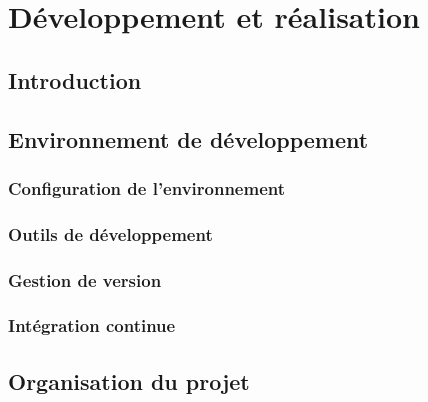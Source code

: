 
\chapter{Développement et réalisation}
\label{chap:realisation}

\section{Introduction}


\section{Environnement de développement}


\subsection{Configuration de l'environnement}


\subsection{Outils de développement}


\subsection{Gestion de version}


\subsection{Intégration continue}


\section{Organisation du projet}


